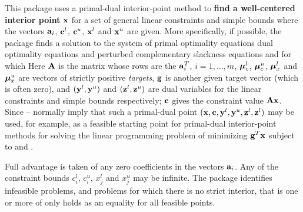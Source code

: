 \documentclass{galahad}
\begin{document}
\galheader


\galsummary
This package uses a primal-dual interior-point method
to {\bf find a well-centered interior point} ${\mathbf{x}}$ for a set of
general linear constraints
and simple bounds
where the vectors 
${\mathbf{a}}_{i}$, ${\mathbf{c}}^{l}$, ${\mathbf{c}}^{u}$, ${\mathbf{x}}^{l}$ and ${\mathbf{x}}^{u}$ are given.
More specifically, if possible, the package finds a solution to the 
system of  primal optimality equations
dual optimality equations
and perturbed complementary slackness equations
and
for which
Here ${\mathbf{A}}$ is the matrix whose rows are the ${\mathbf{a}}_i^T$, $i = 1, \ldots , m$,
$\bm \mu_c^{l}$, $\bm \mu_c^{u}$, $\bm \mu_x^{l}$ and $\bm \mu_x^{u}$ are
vectors of strictly positive {\em targets}, ${\mathbf{g}}$ is another given 
target vector (which is often zero),
and $({\mathbf{y}}^{l}, {\mathbf{y}}^{u})$ and $({\mathbf{z}}^{l}, {\mathbf{z}}^{u})$ are dual variables
for the linear constraints and simple bounds respectively; 
${\mathbf{c}}$ gives the constraint value ${\mathbf{A}} {\mathbf{x}}$.
Since -- normally imply that
such a primal-dual point $({\mathbf{x}}, {\mathbf{c}}, {\mathbf{y}}^{l}, {\mathbf{y}}^{u}, {\mathbf{z}}^{l}, {\mathbf{z}}^{l})$
may be used, for example, as a feasible starting point for primal-dual 
interior-point methods for solving the linear programming problem 
of minimizing ${\mathbf{g}}^T {\mathbf{x}}$ subject to  and .

Full advantage is taken of any zero coefficients in the 
vectors ${\mathbf{a}}_{i}$. 
Any of the constraint bounds $c_{i}^{l}$, $c_{i}^{u}$, 
$x_{j}^{l}$ and $x_{j}^{u}$ may be infinite.
The package identifies infeasible problems, and problems for which there
is no strict interior, that is one or more of 
only holds as an equality for all feasible points.
\end{document}
